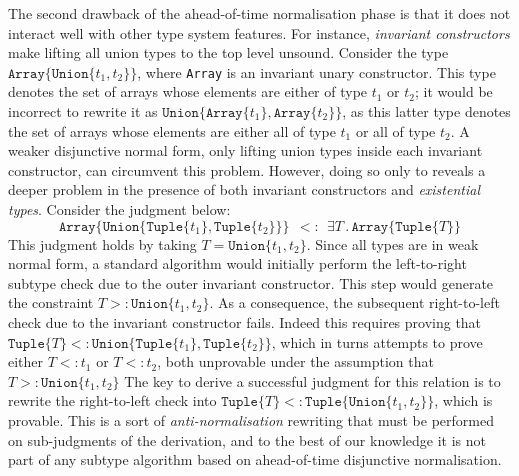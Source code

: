 \documentclass[a4paper,english]{lipics-v2019}
\newcommand{\xt}[1]{\texttt{#1}}
\newcommand{\union}[2]{\xt{Union\{}#1,#2\xt{\}}}
\newcommand{\tuple}[1]{\xt{Tuple\{}#1\xt{\}}}
\newcommand{\arrayt}[1]{\xt{Array\{}#1\xt{\}}}
\begin{document}
The second drawback of the ahead-of-time normalisation phase is that it
does not interact well with other type system features. For instance,
\emph{invariant constructors} make lifting all union types to the top
level unsound.
Consider the type \(\arrayt{\union{t_1}{t_2}}\), where \texttt{Array}
is an invariant unary constructor.  This type
denotes the set of arrays whose elements are either of type \(t_1\) or
\(t_2\); it would be incorrect to rewrite it as
\(\union{\arrayt{t_1}}{\arrayt{t_2}}\),
as this latter type denotes the set of arrays
whose elements are either all of type \(t_1\) or all of type
\(t_2\).  A weaker disjunctive normal form, only lifting union types inside
each invariant constructor, can circumvent this
problem. However, doing so only to reveals a deeper problem in the presence of
 both invariant constructors and \emph{existential types}.
Consider the judgment below:
\[
  \arrayt{\union{\tuple{t_1}}{\tuple{t_2}}} \ \ <:\ \ \exists T\,.\, \arrayt{\tuple{T}}
\]
This judgment holds by taking \(T = \union{t_1}{t_2}\).  Since all
types are in weak normal form, a standard algorithm would initially
perform the left-to-right subtype check due to the outer invariant
constructor.  This step would generate the constraint \(T >:
\union{t_1}{t_2}\).  As a consequence, the subsequent right-to-left
check due to the invariant constructor fails.  Indeed this requires
proving that \(\tuple{T} <: \union{\tuple{t_1}}{\tuple{t_2}}\), which
in turns attempts to prove either \(T <: t_1\) or \(T <: t_2\),
both unprovable under the assumption that \(T >: \union{t_1}{t_2}\)
The key to derive a successful judgment for this relation is to rewrite the
right-to-left check into \(\tuple{T} <: \tuple{\union{t_1}{t_2}}\),
which is provable. This is a sort of \emph{anti-normalisation} rewriting that
must be performed on sub-judgments of the derivation, and to the best
of our knowledge it is not part
of any subtype algorithm based on ahead-of-time disjunctive normalisation.


\end{document}

